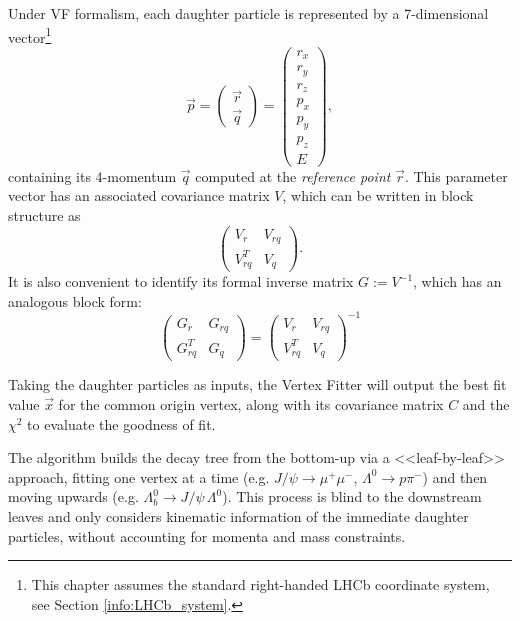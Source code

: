 Under VF formalism, each daughter particle is represented by a 7-dimensional vector\footnote{This chapter assumes the standard right-handed LHCb coordinate system, see Section \ref{info:LHCb_system}.}
\begin{equation}
	\vec{p} = \begin{pmatrix}
		\vec{r} \\ \vec{q}
	\end{pmatrix}
	=
	\begin{pmatrix}
		r_x \\ r_y \\ r_z \\ p_x \\ p_y \\ p_z \\ E
	\end{pmatrix},
	\label{eq:particle_representation}
\end{equation}
containing its 4-momentum $\vec{q}$ computed at the \textit{reference point} $\vec{r}$.
This parameter vector has an associated covariance matrix $V$, which can be written in block structure as
\begin{equation}
	\begin{pmatrix}
		V_r      & V_{rq} \\
		V_{rq}^T & V_q
	\end{pmatrix}.
	\label{eq:par_covmatrix}
\end{equation}
It is also convenient to identify its formal inverse matrix $G := V^{-1}$, which has an analogous block form:
\begin{equation}
	\begin{pmatrix}
		G_r      & G_{rq} \\
		G_{rq}^T & G_q
	\end{pmatrix}
	=
	\begin{pmatrix}
		V_r      & V_{rq} \\
		V_{rq}^T & V_q
	\end{pmatrix}^{-1}
\end{equation}

Taking the daughter particles as inputs, the Vertex Fitter will output the best fit value $\vec{x}$ for the common origin vertex, along with its covariance matrix $C$ and the $\chi^2$ to evaluate the goodness of fit.

The algorithm builds the decay tree from the bottom-up via a <<leaf-by-leaf>> approach, fitting one vertex at a time (e.g. $J/\psi \rightarrow \mu^+ \mu^-$, $\Lambda^0 \rightarrow p \pi^-$) and then moving upwards (e.g. $\Lambda_b^0 \rightarrow J/\psi\,\Lambda^0$).
This process is blind to the downstream leaves and only considers kinematic information of the immediate daughter particles, without accounting for momenta and mass constraints.

